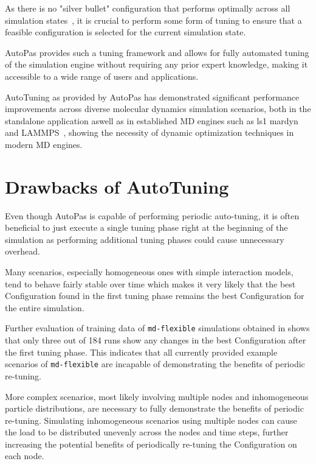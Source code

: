 \documentclass[conference]{IEEEtran}
\begin{document}
As there is no "silver bullet" configuration that performs optimally across all simulation states~\cite{Tchipev2020}, it is crucial to perform some form of tuning to ensure that a feasible configuration is selected for the current simulation state.

AutoPas provides such a tuning framework and allows for fully automated tuning of the simulation engine without requiring any prior expert knowledge, making it accessible to a wide range of users and applications.

AutoTuning as provided by AutoPas has demonstrated significant performance improvements across diverse molecular dynamics simulation scenarios, both in the standalone application aswell as in established MD engines such as ls1 mardyn and LAMMPS~\cite{SECKLER2021101296}\cite{Gratl2022AutoPas}, showing the necessity of dynamic optimization techniques in modern MD engines.

\section{Drawbacks of AutoTuning}

Even though AutoPas is capable of performing periodic auto-tuning, it is often beneficial to just execute a single tuning phase right at the beginning of the simulation as performing additional tuning phases could cause unnecessary overhead.

Many scenarios, especially homogeneous ones with simple interaction models, tend to behave fairly stable over time which makes it very likely that the best Configuration found in the first tuning phase remains the best Configuration for the entire simulation.

Further evaluation of training data of \texttt{md-flexible} simulations obtained in \cite{lerchner2024} shows that only three out of 184 runs show any changes in the best Configuration after the first tuning phase. This indicates that all currently provided example scenarios of \texttt{md-flexible} are incapable of demonstrating the benefits of periodic re-tuning.

More complex scenarios, most likely involving multiple nodes and inhomogeneous particle distributions, are necessary to fully demonstrate the benefits of periodic re-tuning. Simulating inhomogeneous scenarios using multiple nodes can cause the load to be distributed unevenly across the nodes and time steps, further increasing the potential benefits of periodically re-tuning the Configuration on each node.
\end{document}
